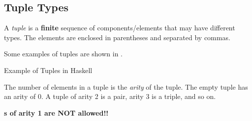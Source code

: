 \subsection{Tuple Types}\label{subsec:Tuple_Types}
\begin{definition}[Tuple]\label{def:Tuple}
  A \emph{tuple} is a \textbf{finite} sequence of components/elements that may have different types.
  The elements are enclosed in parentheses and separated by commas.

  Some examples of tuples are shown in .
\end{definition}

\begin{listing}[h!tbp]
\caption{Example of Tuples in Haskell}
\label{lst:Tuple_Examples}
\end{listing}

The number of elements in a tuple is the \emph{arity} of the tuple.
The empty tuple has an arity of 0.
A tuple of arity 2 is a pair, arity 3 is a triple, and so on.

\begin{blackbox}
  {\large{\textbf{s of arity 1 are NOT allowed!!}}}
\end{blackbox}


